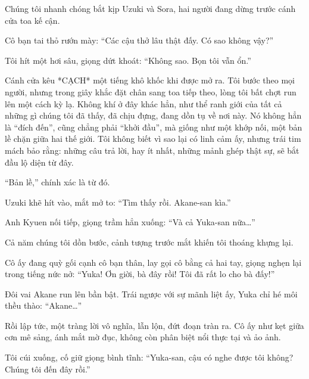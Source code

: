 \documentclass[../main.tex]{subfiles}
\begin{document}


Chúng tôi nhanh chóng bắt kịp Uzuki và Sora, hai người đang dừng trước cánh cửa toa kế cận.

Cô bạn tai thỏ rướn mày: ``Các cậu thở lâu thật đấy. Có sao không vậy?''

Tôi hít một hơi sâu, giọng dứt khoát: ``Không sao. Bọn tôi vẫn ổn.''

Cánh cửa kêu *CẠCH* một tiếng khô khốc khi được mở ra. Tôi bước theo mọi người, nhưng trong giây khắc đặt chân sang toa tiếp theo, lòng tôi bất chợt run lên một cách kỳ lạ. Không khí ở đây khác hẳn, như thể ranh giới của tất cả những gì chúng tôi đã thấy, đã chịu đựng, đang dồn tụ về nơi này. Nó không hẳn là ``đích đến'', cũng chẳng phải ``khởi đầu'', mà giống như một khớp nối, một bản lề chặn giữa hai thế giới. Tôi không biết vì sao lại có linh cảm ấy, nhưng trái tim mách bảo rằng: những câu trả lời, hay ít nhất, những mảnh ghép thật sự, sẽ bắt đầu lộ diện từ đây.

``Bản lề,'' chính xác là từ đó.

Uzuki khẽ hít vào, mắt mở to: ``Tìm thấy rồi. Akane-san kìa.''

Anh Kyuen nối tiếp, giọng trầm hẳn xuống: ``Và cả Yuka-san nữa\dots''

Cả năm chúng tôi dồn bước, cảnh tượng trước mắt khiến tôi thoáng khựng lại.

Cô ấy đang quỳ gối cạnh cô bạn thân, lay gọi cô bằng cả hai tay, giọng nghẹn lại trong tiếng nức nở: ``Yuka! Ơn giời, bà đây rồi! Tôi đã rất lo cho bà đấy!''


Đôi vai Akane run lên bần bật. Trái ngược với sự mãnh liệt ấy, Yuka chỉ hé môi thều thào: ``Akane\dots''

Rồi lập tức, một tràng lời vô nghĩa, lẫn lộn, đứt đoạn tràn ra. Cô ấy như kẹt giữa cơn mê sảng, ánh mắt mờ đục, không còn phân biệt nổi thực tại và ảo ảnh.

Tôi cúi xuống, cố giữ giọng bình tĩnh: ``Yuka-san, cậu có nghe được tôi không? Chúng tôi đến đây rồi.''
\end{document}
